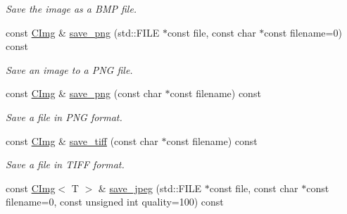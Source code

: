 \begin{DoxyCompactItemize}
\begin{DoxyCompactList}\small\item\em Save the image as a BMP file. \item\end{DoxyCompactList}\item 
const \hyperlink{structcimg__library_1_1_c_img}{CImg} \& \hyperlink{structcimg__library_1_1_c_img_ad9fa47a9f824507ce8feb7d9f6e76b06}{save\_\-png} (std::FILE $\ast$const file, const char $\ast$const filename=0) const 
\begin{DoxyCompactList}\small\item\em Save an image to a PNG file. \item\end{DoxyCompactList}\item 
\hypertarget{structcimg__library_1_1_c_img_a8619972ee3d37f3f389a9c2df1b29005}{
const \hyperlink{structcimg__library_1_1_c_img}{CImg} \& \hyperlink{structcimg__library_1_1_c_img_a8619972ee3d37f3f389a9c2df1b29005}{save\_\-png} (const char $\ast$const filename) const }
\label{structcimg__library_1_1_c_img_a8619972ee3d37f3f389a9c2df1b29005}

\begin{DoxyCompactList}\small\item\em Save a file in PNG format. \item\end{DoxyCompactList}\item 
\hypertarget{structcimg__library_1_1_c_img_ac15df3e33a1ec6c37e26329f84ae0e13}{
const \hyperlink{structcimg__library_1_1_c_img}{CImg} \& \hyperlink{structcimg__library_1_1_c_img_ac15df3e33a1ec6c37e26329f84ae0e13}{save\_\-tiff} (const char $\ast$const filename) const }
\label{structcimg__library_1_1_c_img_ac15df3e33a1ec6c37e26329f84ae0e13}

\begin{DoxyCompactList}\small\item\em Save a file in TIFF format. \item\end{DoxyCompactList}\item 
\hypertarget{structcimg__library_1_1_c_img_aab6eba0352abb4ccfbc03bcb756d4c0b}{
const \hyperlink{structcimg__library_1_1_c_img}{CImg}$<$ T $>$ \& \hyperlink{structcimg__library_1_1_c_img_aab6eba0352abb4ccfbc03bcb756d4c0b}{save\_\-jpeg} (std::FILE $\ast$const file, const char $\ast$const filename=0, const unsigned int quality=100) const }
\label{structcimg__library_1_1_c_img_aab6eba0352abb4ccfbc03bcb756d4c0b}


\end{DoxyCompactItemize}
